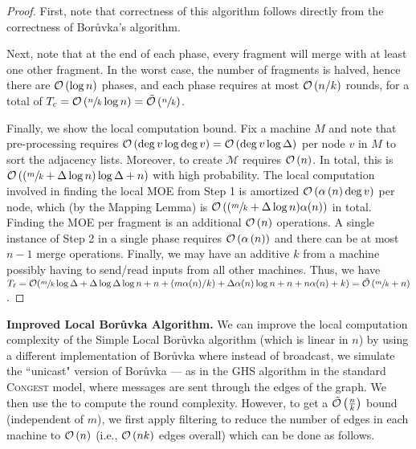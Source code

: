 \begin{proof}
    First, note that correctness of this algorithm follows directly from the correctness of Bor\r{u}vka's algorithm.


    Next, note that at the end of each phase, every fragment will merge with at least one other fragment. In the worst case, the number of fragments is halved, hence there are \(\mathcal{O}\left(\log{n}\right)\) phases, and each phase requires at most \(\mathcal{O}\left(n/k\right)\) rounds, for a total of $T_c=\mathcal{O}\left(\sfrac{n}{k}\log{n}\right)=\tilde{\mathcal{O}}\left(\sfrac{n}{k}\right)$.

    Finally, we show the local computation bound. Fix a machine \(M\) and note that pre-processing requires $\mathcal{O}\left(\deg{v}\log{\deg{v}}\right) = \mathcal{O}\left(\deg{v}\log{\Delta}\right)$ per node $v$ in \(M\) to sort the adjacency lists. Moreover, to create \(\mathcal{M}\) requires \(\mathcal{O}\left(n\right)\). In total, this is \(\mathcal{O}\left(\left(\sfrac{m}{k}+\Delta\log{n}\right)\log{\Delta} + n\right)\) with high probability. The local computation involved in finding the local MOE from Step 1 is amortized \(\mathcal{O}\left(\alpha\left(n\right)\deg{v}\right)\) 
    per node, which (by the Mapping Lemma) is \(\mathcal{O}\left((\sfrac{m}{k} + \Delta \log n) \alpha(n)\right)\) in total. Finding the MOE per fragment is an additional \(\mathcal{O}\left(n\right)\) operations. A single instance of Step 2 in a single phase requires \(\mathcal{O}\left(\alpha\left(n\right)\right)\) and there can be at most $n-1$ merge operations. Finally, we may have an additive $k$ from a machine possibly having to send/read inputs from all other machines. Thus, we have
	$T_{\ell}=\mathcal{O}(\sfrac{m}{k}\log{\Delta} + \Delta\log{\Delta}\log{n} + n + (m \alpha(n)/k)\linebreak + \Delta \alpha(n) \log n  + n + n \alpha(n)  + k) = \softO{\sfrac{m}{k} + n}$.\qedhere
\end{proof}


\noindent \textbf{Improved Local Bor\r{u}vka Algorithm.}\label{subsec:improved-boruvka}
We can improve the local computation complexity of the Simple Local Bor\r{u}vka algorithm
(which is linear in $n$)  by using a different implementation of Bor\r{u}vka where instead
of broadcast, we simulate the ``unicast" version of Bor\r{u}vka --- as in the GHS algorithm
in the standard \textsc{Congest} model, where  messages are sent through the edges of the graph.
We then use the  to compute
the round complexity. However, to get a $\tilde{\mathcal{O}}\left(\frac{n}{k}\right)$ bound (independent of $m$), we first apply filtering to reduce
the number of edges in each machine to $\mathcal{O}\left(n\right)$ (i.e., $\mathcal{O}\left(nk\right)$ edges overall) which can be done as follows.

